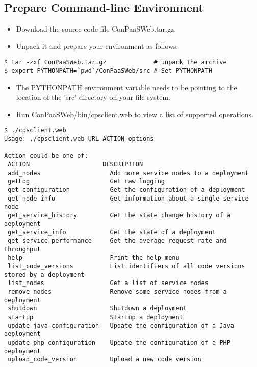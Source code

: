 \documentclass[10pt]{article}
\newenvironment{framedbox}[1]%
{\begin{framed}
 \begingroup
 \fontsize{#1}{#1}\selectfont
}
{
 \endgroup
 \end{framed}
}
\begin{document}
\subsection{Prepare Command-line Environment}
\begin{itemize}
\item Download the source code file ConPaaSWeb.tar.gz.
\item Unpack it and prepare your environment as follows:
\end{itemize}
\begin{framedbox}{12pt}\begin{verbatim}
$ tar -zxf ConPaaSWeb.tar.gz             # unpack the archive
$ export PYTHONPATH=`pwd`/ConPaaSWeb/src # Set PYTHONPATH
\end{verbatim}\end{framedbox}
\begin{itemize}
\item The PYTHONPATH environment variable needs to be pointing to the
      location of the 'src' directory on your file system.
\item Run ConPaaSWeb/bin/cpsclient.web to view a list of supported
      operations.
\end{itemize}
\begin{framedbox}{8pt}\begin{verbatim}
$ ./cpsclient.web
Usage: ./cpsclient.web URL ACTION options

Action could be one of:
 ACTION                    DESCRIPTION
 add_nodes                   Add more service nodes to a deployment
 getLog                      Get raw logging
 get_configuration           Get the configuration of a deployment
 get_node_info               Get information about a single service node
 get_service_history         Get the state change history of a deployment
 get_service_info            Get the state of a deployment
 get_service_performance     Get the average request rate and throughput
 help                        Print the help menu
 list_code_versions          List identifiers of all code versions stored by a deployment
 list_nodes                  Get a list of service nodes
 remove_nodes                Remove some service nodes from a deployment
 shutdown                    Shutdown a deployment
 startup                     Startup a deployment
 update_java_configuration   Update the configuration of a Java deployment
 update_php_configuration    Update the configuration of a PHP deployment
 upload_code_version         Upload a new code version
\end{verbatim}\end{framedbox}
\end{document}
